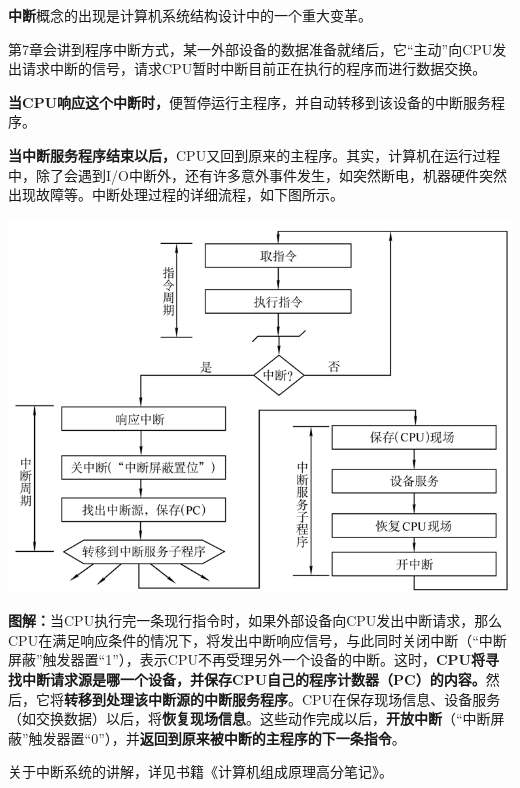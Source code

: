 {\textbf{中断}}概念的出现是计算机系统结构设计中的一个重大变革。

第7章会讲到程序中断方式，某一外部设备的数据准备就绪后，它``主动''向CPU发出请求中断的信号，请求CPU暂时中断目前正在执行的程序而进行数据交换。

\textbf{当CPU响应这个中断时，}便暂停运行主程序，并自动转移到该设备的中断服务程序。

\textbf{当中断服务程序结束以后，}CPU又回到原来的主程序。其实，计算机在运行过程中，除了会遇到I/O中断外，还有许多意外事件发生，如突然断电，机器硬件突然出现故障等。中断处理过程的详细流程，如下图所示。

\includegraphics[width=6in]{png-jpeg-pics/7C2E026DFCC048F8EF1C3A969D5AE3F2.png}

\textbf{图解：}当CPU执行完一条现行指令时，如果外部设备向CPU发出中断请求，那么CPU在满足响应条件的情况下，将发出中断响应信号，与此同时关闭中断（``中断屏蔽''触发器置``1''），表示CPU不再受理另外一个设备的中断。这时，\textbf{CPU将寻找中断请求源是哪一个设备，并保存CPU自己的程序计数器（PC）的内容。}然后，它将\textbf{转移到处理该中断源的中断服务程序}。CPU在保存现场信息、设备服务（如交换数据）以后，将\textbf{恢复现场信息}。这些动作完成以后，\textbf{开放中断}（``中断屏蔽''触发器置``0''），并\textbf{返回到原来被中断的主程序的下一条指令}。

{关于中断系统的讲解，详见书籍《计算机组成原理高分笔记》。}
